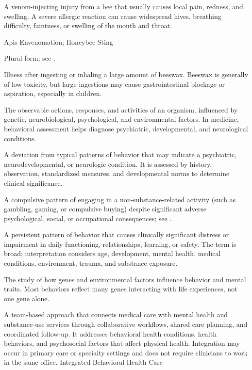  A venom-injecting injury from a bee that usually causes local pain, redness, and swelling. A severe allergic reaction can cause widespread hives, breathing difficulty, faintness, or swelling of the mouth and throat.

\synonyms
Apis Envenomation; Honeybee Sting

 Plural form; see .

 Illness after ingesting or inhaling a large amount of beeswax. Beeswax is generally of low toxicity, but large ingestions may cause gastrointestinal blockage or aspiration, especially in children.

 The observable actions, responses, and activities of an organism, influenced by genetic, neurobiological, psychological, and environmental factors. In medicine, behavioral assessment helps diagnose psychiatric, developmental, and neurological conditions.

 A deviation from typical patterns of behavior that may indicate a psychiatric, neurodevelopmental, or neurologic condition. It is assessed by history, observation, standardized measures, and developmental norms to determine clinical significance.

 A compulsive pattern of engaging in a non-substance-related activity (such as gambling, gaming, or compulsive buying) despite significant adverse psychological, social, or occupational consequences; see .

 A persistent pattern of behavior that causes clinically significant distress or impairment in daily functioning, relationships, learning, or safety. The term is broad; interpretation considers age, development, mental health, medical conditions, environment, trauma, and substance exposure.

 The study of how genes and environmental factors influence behavior and mental traits. Most behaviors reflect many genes interacting with life experiences, not one gene alone.

 A team-based approach that connects medical care with mental health and substance-use services through
collaborative workflows, shared care planning, and coordinated follow-up. It addresses behavioral
health conditions, health behaviors, and psychosocial factors that affect physical health.
Integration may occur in primary care or specialty settings and does not require clinicians
to work in the same office.
\synonyms
Integrated Behavioral Health Care

